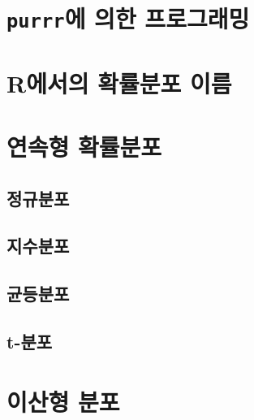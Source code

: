 \documentclass[
]{book}
\begin{document}
\hypertarget{purrruxc5d0-uxc758uxd55c-uxd504uxb85cuxadf8uxb798uxbc0d}{%
\section{\texorpdfstring{\texttt{purrr}에 의한 프로그래밍}{purrr에 의한 프로그래밍}}\label{purrruxc5d0-uxc758uxd55c-uxd504uxb85cuxadf8uxb798uxbc0d}}

\hypertarget{ruxc5d0uxc11cuxc758-uxd655uxb960uxbd84uxd3ec-uxc774uxb984}{%
\section{R에서의 확률분포 이름}\label{ruxc5d0uxc11cuxc758-uxd655uxb960uxbd84uxd3ec-uxc774uxb984}}

\hypertarget{uxc5f0uxc18duxd615-uxd655uxb960uxbd84uxd3ec}{%
\section{연속형 확률분포}\label{uxc5f0uxc18duxd615-uxd655uxb960uxbd84uxd3ec}}

\hypertarget{uxc815uxaddcuxbd84uxd3ec}{%
\subsection{정규분포}\label{uxc815uxaddcuxbd84uxd3ec}}

\hypertarget{uxc9c0uxc218uxbd84uxd3ec}{%
\subsection{지수분포}\label{uxc9c0uxc218uxbd84uxd3ec}}

\hypertarget{uxade0uxb4f1uxbd84uxd3ec}{%
\subsection{균등분포}\label{uxade0uxb4f1uxbd84uxd3ec}}

\hypertarget{t-uxbd84uxd3ec}{%
\subsection{t-분포}\label{t-uxbd84uxd3ec}}

\hypertarget{uxc774uxc0b0uxd615-uxbd84uxd3ec}{%
\section{이산형 분포}\label{uxc774uxc0b0uxd615-uxbd84uxd3ec}}
\end{document}
